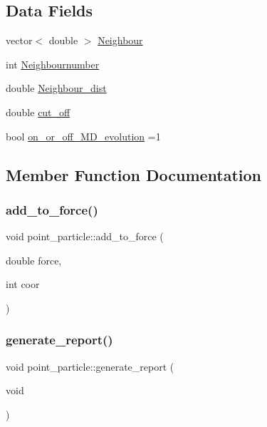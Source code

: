 \subsection*{Data Fields}
\begin{DoxyCompactItemize}
\item 
vector$<$ double $>$ \mbox{\hyperlink{classpoint__particle_a00cb25fd2627593ac107a232efbdb65d}{Neighbour}}
\item 
int \mbox{\hyperlink{classpoint__particle_a434dc5e0503b9c29546dd906b57288fd}{Neighbournumber}}
\item 
double \mbox{\hyperlink{classpoint__particle_a0d5ac2e186afd64b4d50ec2835fe9706}{Neighbour\+\_\+dist}}
\item 
double \mbox{\hyperlink{classpoint__particle_ab6a87fce5a3b85ca0b2037066fa31e63}{cut\+\_\+off}}
\item 
bool \mbox{\hyperlink{classpoint__particle_afee389a618e3c3c64e255329b1985ae3}{on\+\_\+or\+\_\+off\+\_\+\+M\+D\+\_\+evolution}} =1
\end{DoxyCompactItemize}


\subsection{Member Function Documentation}
\mbox{\label{classpoint__particle_aee14a82e8900194e3858fe19822725cd}} 
\subsubsection{\texorpdfstring{add\_to\_force()}{add\_to\_force()}}
{\footnotesize\ttfamily void point\+\_\+particle\+::add\+\_\+to\+\_\+force (\begin{DoxyParamCaption}\item[{double}]{force,  }\item[{int}]{coor }\end{DoxyParamCaption})\hspace{0.3cm}{\ttfamily [inline]}}

\mbox{\label{classpoint__particle_a8a89ec34d7dc2e1a54c3e0b58d23ff06}} 
\subsubsection{\texorpdfstring{generate\_report()}{generate\_report()}}
{\footnotesize\ttfamily void point\+\_\+particle\+::generate\+\_\+report (\begin{DoxyParamCaption}\item[{void}]{ }\end{DoxyParamCaption})}

